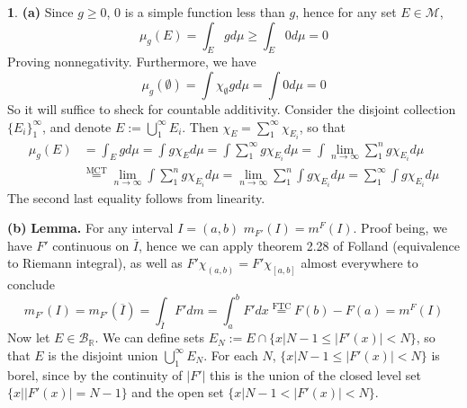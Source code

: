 \documentclass[10.5pt]{article}
\theoremstyle{definition}
\newtheorem{pb}{}
\newcommand{\set}[1]{\{#1\}}
\newcommand{\abs}[1]{\lvert#1\rvert}
\begin{document}
\begin{pb}
    \textbf{(a)} Since \(g \geq 0\), \(0\) is a simple function less than \(g\), hence for any set \(E \in \mathcal{M}\),
    \[\mu_g(E) = \int_E g d\mu \geq \int_E 0 d\mu = 0\]
    Proving nonnegativity. Furthermore, we have \[\mu_g(\emptyset) = \int \chi_\emptyset g d\mu = \int 0 d\mu = 0\]
    So it will suffice to sheck for countable additivity. Consider the disjoint collection \(\set{E_i}_1^\infty\), and denote \(E := \bigcup_1^\infty E_i\).
    Then \(\chi_E = \sum_1^\infty \chi_{E_i}\), so that
    \begin{align*}
        \mu_g(E) &= \int_E gd\mu = \int g\chi_E d\mu = \int \sum_1^\infty g \chi_{E_i} d\mu = \int \lim_{n\to\infty} \sum_1^n g \chi_{E_i} d\mu \\
    &\overset{\text{MCT}}{=} \lim_{n\to\infty}\int \sum_1^n g\chi_{E_i}d\mu = \lim_{n\to\infty} \sum_1^n \int g\chi_{E_i}d\mu = \sum_1^\infty \int g\chi_{E_i}d\mu
\end{align*}
    The second last equality follows from linearity.

    \textbf{(b)}
    \textbf{Lemma.} For any interval \(I = (a,b)\) \(m_{F'}(I) = m^F(I)\). Proof being, we have \(F'\) continuous on \(\overline{I}\), hence we can apply theorem 2.28 of Folland (equivalence to Riemann integral), as well as
    \(F' \chi_{(a,b)} = F' \chi_{[a,b]}\) almost everywhere to conclude
    \[m_{F'}(I) = m_{F'}(\overline{I}) = \int_{\overline{I}} F' dm = \int_a^b F' dx \overset{\text{FTC}}{=} F(b) - F(a) = m^F(I)\]
    Now let \(E \in \mathcal{B}_\mathbb{R}\). We can define sets \(E_N := E \cap \set{x \vert N - 1 \leq \abs{F'(x)} < N}\), so that \(E\) is the disjoint union \(\bigcup_1^\infty E_N\). For each \(N\),
    \(\set{x \vert N - 1 \leq \abs{F'(x)} < N}\) is borel, since by the continuity of \(\abs{F'}\) this is the union of the closed level set \(\set{x \vert \abs{F'(x)} = N-1}\) and the open set 
    \(\set{x \vert N-1 < \abs{F'(x)} < N}\).
    

\end{pb}
\end{document}
